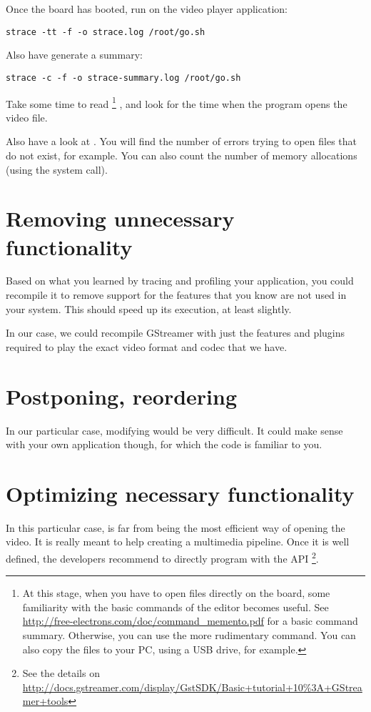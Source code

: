 Once the board has booted, run  on the video player
application:

\begin{verbatim}
strace -tt -f -o strace.log /root/go.sh
\end{verbatim}

Also have  generate a summary: 

\begin{verbatim}
strace -c -f -o strace-summary.log /root/go.sh
\end{verbatim}

Take some time to read 
\footnote{At this stage, when you have to open files directly on the
board, some familiarity with the basic commands of the  editor
becomes useful. See
\url{http://free-electrons.com/doc/command_memento.pdf} for a basic
command summary. Otherwise, you can use the more rudimentary 
command. You can also copy the files to your PC, using a USB drive, for
example.}
, and look for the time when the program opens the video file.

Also have a look at . You will find the number
of errors trying to open files that do not exist, for example. You can
also count the number of memory allocations (using the  system call). 

\section{Removing unnecessary functionality}

Based on what you learned by tracing and profiling your application, you
could recompile it to remove support for the features that you know are
not used in your system. This should speed up its execution, at least
slightly.

In our case, we could recompile GStreamer with just the features
and plugins required to play the exact video format and codec that we
have.

\section{Postponing, reordering}

In our particular case, modifying  would be very
difficult. It could make sense with your own application though, for
which the code is familiar to you.

\section{Optimizing necessary functionality}

In this particular case,  is far from being the most
efficient way of opening the video. It is really meant to help creating
a multimedia pipeline. Once it is well defined, the 
developers recommend to directly program with the  API
\footnote{See the details on 
\url{http://docs.gstreamer.com/display/GstSDK/Basic+tutorial+10\%3A+GStreamer+tools}}.
